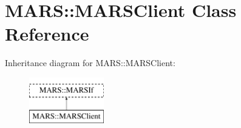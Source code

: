 \hypertarget{classMARS_1_1MARSClient}{}\section{M\+A\+RS\+:\+:M\+A\+R\+S\+Client Class Reference}
\label{classMARS_1_1MARSClient}
Inheritance diagram for M\+A\+RS\+:\+:M\+A\+R\+S\+Client\+:\begin{figure}[H]
\begin{center}
\leavevmode
\includegraphics[height=2.000000cm]{classMARS_1_1MARSClient}
\end{center}
\end{figure}
